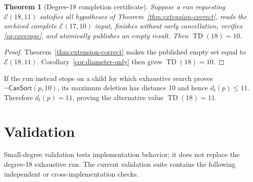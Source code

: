 \documentclass[11pt]{article}
\newtheorem{theorem}{Theorem}[section]
\theoremstyle{definition}
\theoremstyle{remark}
\newcommand{\TD}{\operatorname{TD}}
\newcommand{\dist}{d_t}
\newcommand{\E}{\mathcal E}
\newcommand{\CanSort}{\mathsf{CanSort}}
\begin{document}
\begin{theorem}[Degree-18 completion certificate]
\label{thm:certificate}
Suppose a run requesting $\E(18,11)$ satisfies all hypotheses of
Theorem~\ref{thm:extension-correct}, reads the archived complete
$\E(17,10)$ input, finishes without early cancellation, verifies
\eqref{eq:coverage}, and atomically publishes an empty result.  Then
$\TD(18)=10$.
\end{theorem}

\begin{proof}
Theorem~\ref{thm:extension-correct} makes the published empty set equal to
$\E(18,11)$.  Corollary~\ref{cor:diameter-only} then gives
$\TD(18)=10$.
\end{proof}

If the run instead stops on a child for which exhaustive search proves
$\neg\CanSort(p,10)$, its maximum deletion has distance 10 and hence
$\dist(p)\leq11$.  Therefore $\dist(p)=11$, proving the alternative value
$\TD(18)=11$.

\section{Validation}
\label{sec:validation}

Small-degree validation tests implementation behavior; it does not replace
the degree-18 exhaustive run.  The current validation suite contains the
following independent or cross-implementation checks.
\end{document}
